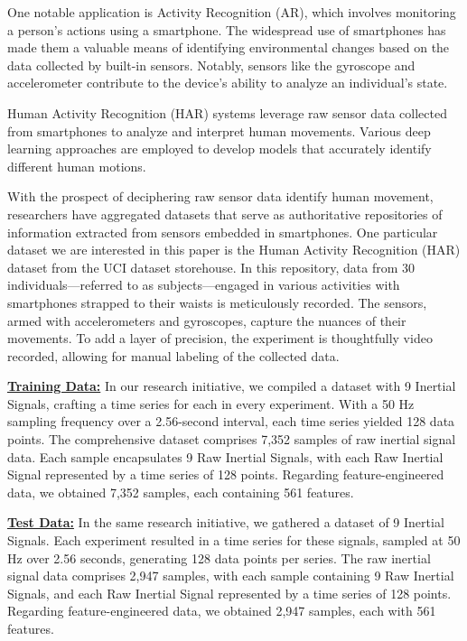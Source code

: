 \documentclass[conference]{IEEEtran}
\begin{document}
One notable application is Activity Recognition (AR), which involves monitoring a person's actions using a smartphone. The widespread use of smartphones has made them a valuable means of identifying environmental changes based on the data collected by built-in sensors. Notably, sensors like the gyroscope and accelerometer contribute to the device's ability to analyze an individual's state.

Human Activity Recognition (HAR) systems leverage raw sensor data collected from smartphones to analyze and interpret human movements. Various deep learning approaches are employed to develop models that accurately identify different human motions.


With the  prospect of deciphering raw sensor data identify human movement, researchers have aggregated datasets that serve as authoritative repositories of information extracted from sensors embedded in smartphones. One particular dataset we are interested in this paper is the Human Activity Recognition (HAR) dataset from the UCI dataset storehouse. In this repository, data from 30 individuals—referred to as subjects—engaged in various activities with smartphones strapped to their waists is meticulously recorded. The sensors, armed with accelerometers and gyroscopes, capture the nuances of their movements. To add a layer of precision, the experiment is thoughtfully video recorded, allowing for manual labeling of the collected data. \newline 


\textbf{\underline{Training Data:}} \newline
In our research initiative, we compiled a dataset with 9 Inertial Signals, crafting a time series for each in every experiment. With a 50 Hz sampling frequency over a 2.56-second interval, each time series yielded 128 data points. The comprehensive dataset comprises 7,352 samples of raw inertial signal data. Each sample encapsulates 9 Raw Inertial Signals, with each Raw Inertial Signal represented by a time series of 128 points. Regarding feature-engineered data, we obtained 7,352 samples, each containing 561 features. \newline

\textbf{\underline{Test Data:}} \newline
In the same research initiative, we  gathered a dataset of 9 Inertial Signals. Each experiment resulted in a time series for these signals, sampled at 50 Hz over 2.56 seconds, generating 128 data points per series. The raw inertial signal data comprises 2,947 samples, with each sample containing 9 Raw Inertial Signals, and each Raw Inertial Signal represented by a time series of 128 points. Regarding feature-engineered data, we obtained 2,947 samples, each with 561 features.
\newline
\end{document}
